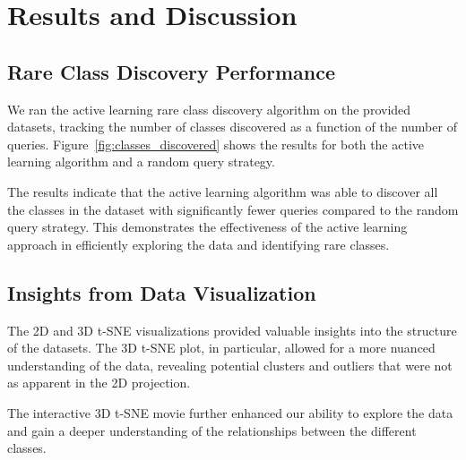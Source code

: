 
\section{Results and Discussion}
\subsection{Rare Class Discovery Performance}
We ran the active learning rare class discovery algorithm on the provided datasets, tracking the number of classes discovered as a function of the number of queries. Figure~\ref{fig:classes_discovered} shows the results for both the active learning algorithm and a random query strategy.


The results indicate that the active learning algorithm was able to discover all the classes in the dataset with significantly fewer queries compared to the random query strategy. This demonstrates the effectiveness of the active learning approach in efficiently exploring the data and identifying rare classes.

\subsection{Insights from Data Visualization}
The 2D and 3D t-SNE visualizations provided valuable insights into the structure of the datasets. The 3D t-SNE plot, in particular, allowed for a more nuanced understanding of the data, revealing potential clusters and outliers that were not as apparent in the 2D projection.

The interactive 3D t-SNE movie further enhanced our ability to explore the data and gain a deeper understanding of the relationships between the different classes.